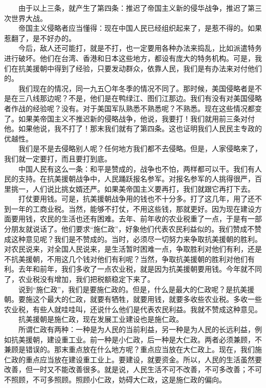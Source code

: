 \documentclass[cn,11pt,chinese]{elegantbook}
\begin{document}
　　由于以上三条，就产生了第四条：推迟了帝国主义新的侵华战争，推迟了第三次世界大战。\\
　　帝国主义侵略者应当懂得：现在中国人民已经组织起来了，是惹不得的。如果惹翻了，是不好办的。\\
　　今后，敌人还可能打，就是不打，也一定要用各种办法来捣乱，比如派遣特务进行破坏。他们在台湾、香港和日本这些地方，都设有庞大的特务机构。可是，我们在抗美援朝中得到了经验，只要发动群众，依靠人民，我们是有办法来对付他们的。\\
　　我们现在的情况，同一九五〇年冬季的情况不同了。那时候，美国侵略者是不是在三八线那边呢？不是，他们是在鸭绿江、图们江那边。我们有没有对美国侵略者作战的经验呢？没有。对于美国军队熟悉不熟悉呢？不熟悉。现在这些情况都变了。如果美帝国主义不推迟新的侵略战争，他说，我要打！我们就用前三条对付他。如果他说，我不打了！那末我们就有了第四条。这也证明我们人民民主专政的优越性。\\
　　我们是不是去侵略别人呢？任何地方我们都不去侵略。但是，人家侵略来了，我们就一定要打，而且要打到底。\\
　　中国人民有这么一条：和平是赞成的，战争也不怕，两样都可以干。我们有人民的支持。在抗美援朝战争中，人民踊跃报名参军。对报名参军的人挑得很严，百里挑一，人们说比挑女婿还严。如果美帝国主义要再打，我们就跟它再打下去。\\
　　打仗要用钱。可是，抗美援朝战争用的钱也不十分多。打了这几年，用了还不到一年的工商业税。当然，能够不打仗，不用这些钱，那就更好。因为现在建设方面要用钱，农民的生活也还有困难。去年、前年收的农业税重了一点，于是有一部分朋友就说话了。他们要求“施仁政”，好象他们代表农民利益似的。我们赞成不赞成这种意见呢？我们是不赞成的。当时，必须尽一切努力来争取抗美援朝的胜利。对农民说来，对全国人民说来，是生活暂时困难一点，争取胜利对他们有利，还是不抗美援朝，不用这几个钱对他们有利呢？当然，争取抗美援朝的胜利对他们有利。去年和前年，我们多收了一点农业税，就是因为抗美援朝要用钱。今年就不同了，农业税没有增加，我们把税额稳定下来了。\\
　　说到“施仁政”，我们是要施仁政的。但是，什么是最大的仁政呢？是抗美援朝。要施这个最大的仁政，就要有牺牲，就要用钱，就要多收些农业税。多收一些农业税，有些人就哇哇叫，还说什么他们是代表农民利益。我就不赞成这种意见。\\
　　抗美援朝是施仁政，现在发展工业建设也是施仁政。\\
　　所谓仁政有两种：一种是为人民的当前利益，另一种是为人民的长远利益，例如抗美援朝，建设重工业。前一种是小仁政，后一种是大仁政。两者必须兼顾，不兼顾是错误的。那末重点放在什么地方呢？重点应当放在大仁政上。现在，我们施仁政的重点应当放在建设重工业上。要建设，就要资金。所以，人民的生活虽然要改善，但一时又不能改善很多。就是说，人民生活不可不改善，不可多改善；不可不照顾，不可多照顾。照顾小仁政，妨碍大仁政，这是施仁政的偏向。\\
\end{document}
